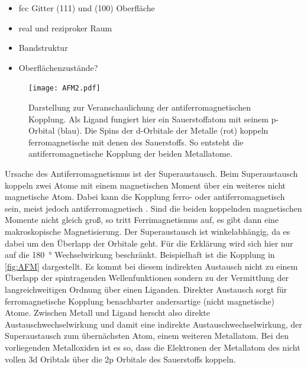         \begin{itemize}
            \item fcc Gitter (111) und (100) Oberfläche
            \item real und reziproker Raum
            \item Bandstruktur
            \item Oberflächenzustände?
        \end{itemize}

        \begin{figure}
            \centering
            \texttt{[image: AFM2.pdf]}
            \caption{Darstellung zur Veranschaulichung der antiferromagnetischen Kopplung.
            Als Ligand fungiert hier ein Sauerstoffatom mit seinem p-Orbital (blau).
            Die Spins der d-Orbitale der Metalle (rot) koppeln ferromagnetische mit denen des Sauerstoffs.
            So entsteht die antiferromagnetische Kopplung der beiden Metallatome.}
            \label{fig:AFM}
        \end{figure}
        Ursache des Antiferromagnetismus ist der Superaustausch.
        Beim Superaustausch koppeln zwei Atome mit einem magnetischen Moment über ein weiteres nicht magnetische Atom. 
        Dabei kann die Kopplung ferro- oder antiferromagnetisch sein, meist jedoch antiferromagnetisch \cite{AFM_1}.
        Sind die beiden koppelnden magnetischen Momente nicht gleich groß, so tritt Ferrimagnetismus auf, es gibt dann eine makroskopische Magnetisierung.
        Der Superaustausch ist winkelabhängig, da es dabei um den Überlapp der Orbitale geht.
        Für die Erklärung wird sich hier nur auf die \SI{180}{\degree} Wechselwirkung beschränkt.
        Beispielhaft ist die Kopplung in \autoref{fig:AFM} dargestellt.
        Es kommt bei diesem indirekten Austausch nicht zu einem Überlapp der spintragenden Wellenfunktionen sondern zu der Vermittlung der langreichweitigen Ordnung über einen Liganden.
        Direkter Austausch sorgt für ferromagnetische Kopplung benachbarter andersartige (nicht magnetische) Atome.
        Zwischen Metall und Ligand herscht also direkte Austauschwechselwirkung und damit eine indirekte Austauschwechselwirkung, der Superaustausch zum übernächsten Atom, einem weiteren Metallatom.
        Bei den vorliegenden Metalloxiden ist es so, dass die Elektronen der Metallatom des nicht vollen 3d Oribtals über die 2p Orbitale des Sauerstoffs koppeln.
